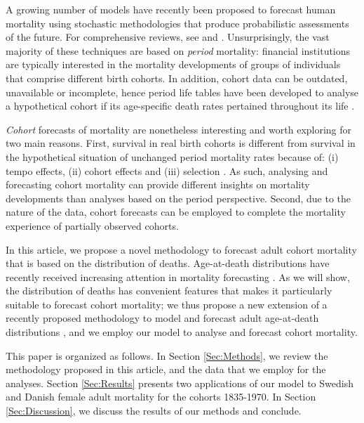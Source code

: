 \documentclass[11pt, a4paper]{article}
\begin{document}
A growing number of models have recently been proposed to forecast human mortality using stochastic methodologies that produce probabilistic assessments of the future. For comprehensive reviews, see \cite{booth2006demographic} and \cite{shang2011point}. Unsurprisingly, the vast majority of these techniques are based on \textit{period} mortality: financial institutions are typically interested in the mortality developments of groups of individuals that comprise different birth cohorts. In addition, cohort data can be outdated, unavailable or incomplete, hence period life tables have been developed to analyse a hypothetical cohort if its age-specific death rates pertained throughout its life \citep{preston2001demogr}. \par 
 
\textit{Cohort} forecasts of mortality are nonetheless interesting and worth exploring for two main reasons. First, survival in real birth cohorts is different from survival in the hypothetical situation of unchanged period mortality rates because of: (i) tempo effects, (ii) cohort effects and (iii) selection \cite[for a full discussion, see][Sect.~2]{borgan2018cohort}. As such, analysing and forecasting cohort mortality can provide different insights on mortality developments than analyses based on the period perspective. Second, due to the nature of the data, cohort forecasts can be employed to complete the mortality experience of partially observed cohorts. \par  

In this article, we propose a novel methodology to forecast adult cohort mortality that is based on the distribution of deaths. Age-at-death distributions have recently received increasing attention in mortality forecasting \citep{oeppen2008coherent,bergeron2017coherent,basellini2019modeling,pascariu2019maximum}. As we will show, the distribution of deaths has convenient features that makes it particularly suitable to forecast cohort mortality; we thus propose a new extension of a recently proposed methodology to model and forecast adult age-at-death distributions \citep{basellini2019modeling}, and we employ our model to analyse and forecast cohort mortality. \par 
 
This paper is organized as follows. In Section \ref{Sec:Methods}, we review the methodology proposed in this article, and the data that we employ for the analyses. Section \ref{Sec:Results} presents two applications of our model to Swedish and Danish female adult mortality for the cohorts 1835-1970. In Section \ref{Sec:Discussion}, we discuss the results of our methods and conclude. 
\end{document}

